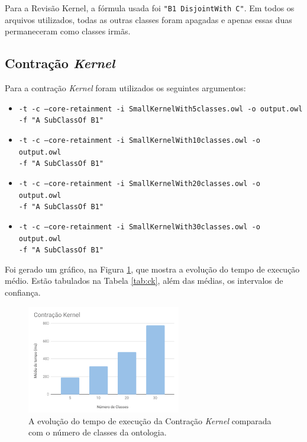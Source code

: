 Para a Revisão Kernel, a fórmula usada foi \texttt{"B1 DisjointWith C"}. Em todos os arquivos utilizados, todas as outras classes foram apagadas e apenas essas duas permaneceram como classes irmãs.

\subsection{Contração \textit{Kernel}}

Para a contração \textit{Kernel} foram utilizados os seguintes argumentos:

\begin{itemize}
	\item \texttt{-t -c --core-retainment -i SmallKernelWith5classes.owl -o output.owl \\ -f "A SubClassOf B1"}
	\item \texttt{-t -c --core-retainment -i SmallKernelWith10classes.owl -o output.owl \\ -f "A SubClassOf B1"}
	\item \texttt{-t -c --core-retainment -i SmallKernelWith20classes.owl -o output.owl \\ -f "A SubClassOf B1"}
	\item \texttt{-t -c --core-retainment -i SmallKernelWith30classes.owl -o output.owl \\ -f "A SubClassOf B1"}
\end{itemize}

Foi gerado um gráfico, na Figura \ref{img:graficock}, que mostra a evolução do tempo de execução médio. Estão tabulados na Tabela \ref{tab:ck}, além das médias, os intervalos de confiança.

\begin{figure}[H]
	\centering
	\includegraphics[width=0.6\textwidth]{Capitulos/Testes/graficock.png}
	\caption{A evolução do tempo de execução da Contração \textit{Kernel} comparada com o número de classes da ontologia.}
	\label{img:graficock}
\end{figure}

